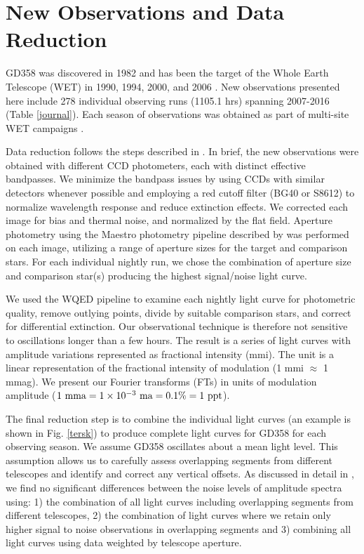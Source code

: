 \documentclass[12pt,preprint]{aastex}
\begin{document}
\section {New Observations and Data Reduction}\label{data}

GD358 was discovered in 1982 \citep{Winget82} and has been the target of the Whole 
Earth Telescope (WET) in 1990, 1994, 2000, and 2006 \citep{Provencal09, Kepler03,Winget94}. 
New observations presented here include 278 individual observing runs (1105.1 hrs) spanning 
2007-2016 (Table \ref{journal}). Each season of observations was obtained as part of 
multi-site WET campaigns \citep{wet90}. 

Data reduction follows the steps described in \citet{Provencal12}. In brief, the new observations 
were obtained with different CCD photometers, each with distinct effective bandpasses. 
We minimize the bandpass issues by using CCDs with similar detectors whenever possible and 
employing a red cutoff filter (BG40 or S8612) to normalize wavelength response and 
reduce extinction effects. We corrected each image for bias and thermal noise, and 
normalized by the flat field. Aperture photometry using the Maestro photometry pipeline 
described by \citet{Dalessio10} was performed on each image, utilizing a range of 
aperture sizes for the target and comparison stars. For each individual nightly run, we 
chose the combination of aperture size and comparison star(s) producing the highest 
signal/noise light curve. 

We used the WQED pipeline \citep{wqed} to examine each nightly light curve for photometric 
quality, remove outlying points, divide by suitable comparison stars, and correct for 
differential extinction. Our observational technique is therefore not sensitive to 
oscillations longer than a few hours. The result is a series of light curves 
with amplitude variations represented as fractional intensity (mmi). The unit is a linear 
representation of the fractional intensity of modulation (1 mmi $\approx$ 1 mmag). We present
our Fourier transforms (FTs) in units of modulation amplitude 
($1\ {\rm mma}=1 \times 10^{-3}\ {\rm ma} = 0.1 \% = 1\ {\rm ppt}$).

The final reduction step is to combine the individual light curves 
(an example is shown in Fig. \ref{tersk}) to produce complete light curves for GD358 for each 
observing season. We assume GD358 oscillates about a mean light level. This assumption 
allows us to carefully assess overlapping segments from different telescopes and identify 
and correct any vertical offsets. As discussed in detail in \citet{Provencal09}, we find 
no significant differences between the noise levels of amplitude spectra using: 
1) the combination of all light curves including overlapping 
segments from different telescopes, 2) the combination of light curves where we retain 
only higher signal to noise observations in overlapping segments and 3) combining all light 
curves using data weighted by telescope aperture.
\end{document}
